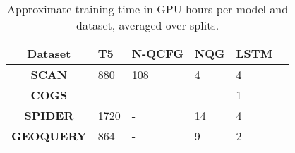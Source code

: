\begin{table}[]
\footnotesize
\centering
\begin{tabular}{clllll}
\toprule
\textbf{Dataset}  & \textbf{T5} & \textbf{N-QCFG} & \textbf{NQG} & \textbf{LSTM} \\
\midrule
\textbf{SCAN}     & 880         & 108                 & 4           & 4             \\
\textbf{COGS}     & -           & -                    & -            & 1             \\
\textbf{SPIDER}   & 1720        & -                    & 14         & 4             \\
\textbf{GEOQUERY} & 864         & -                    & 9           & 2            \\
\bottomrule
\end{tabular}
\caption{Approximate training time in GPU hours per model and dataset, averaged over splits.}
\label{tab:TrainingTime}
\end{table}